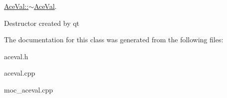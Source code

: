 \hyperlink{classAceVal_a69f8950b854fc3579ebc1395054ba6dc}{Ace\-Val\-::$\sim$\-Ace\-Val}. 

Destructor created by qt 

The documentation for this class was generated from the following files\-:\begin{DoxyCompactItemize}
\item 
aceval.\-h\item 
aceval.\-cpp\item 
moc\-\_\-aceval.\-cpp\end{DoxyCompactItemize}
